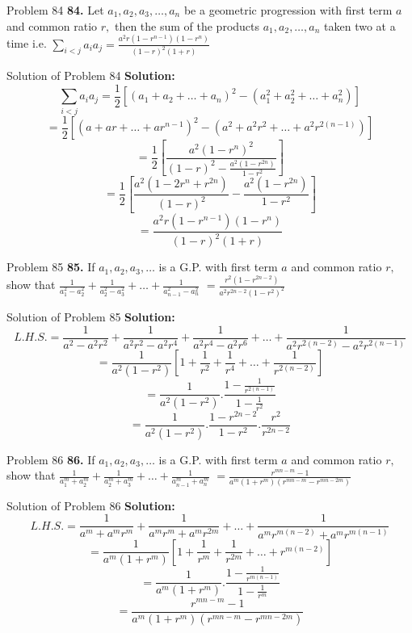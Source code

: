 \documentclass[aspectratio=1610,8pt]{beamer}
\begin{document}
\begin{frame}{Problem 84}
  \textbf{84.} Let $a_1, a_2, a_3, \ldots, a_n$ be a geometric progression with first term $a$ and common ratio $r,$ then the sum
  of the products $a_1, a_2, \ldots, a_n$ taken two at a time i.e. $\sum_{i < j}a_ia_j = \frac{a^2r(1 - r^{n - 1})(1 - r^n)}{(1 -
    r)^2(1 + r)}$
\end{frame}
\begin{frame}{Solution of Problem 84}
  \textbf{Solution:}$$\sum_{i < j}a_ia_j = \frac{1}{2}[(a_1 + a_2 + \ldots + a_n)^2 - (a_1^2 + a_2^2 + \ldots + a_n^2)]$$
  $$= \frac{1}{2}\left[(a + ar + \ldots + ar^{n - 1})^2 - (a^2 + a^2r^2 + \ldots + a^2r^{2(n - 1)})\right]$$
  $$= \frac{1}{2}\left[\frac{a^2(1 - r^n)^2}{(1 - r)^2 - \frac{a^2(1 - r^{2n})}{1 - r^2}}\right]$$
  $$= \frac{1}{2}\left[\frac{a^2(1 - 2r^n + r^{2n})}{(1 - r)^2} - \frac{a^2(1 - r^{2n})}{1 - r^2}\right]$$
  $$= \frac{a^2r(1 - r^{n - 1})(1 - r^n)}{(1 - r)^2(1 + r)}$$
\end{frame}
\begin{frame}{Problem 85}
  \textbf{85.} If $a_1, a_2, a_3, \ldots$ is a G.P. with first term $a$ and common ratio $r,$ show that $\frac{1}{a_1^2 - a_2^2} +
  \frac{1}{a_2^2 - a_3^2} + \ldots + \frac{1}{a_{n - 1}^2 - a_n^2}$ $ = \frac{r^2(1 - r^{2n - 2})}{a^2r^{2n - 2}(1 - r^2)^2}$
\end{frame}
\begin{frame}{Solution of Problem 85}
  \textbf{Solution:} $$L.H.S. = \frac{1}{a^2 - a^2r^2} + \frac{1}{a^2r^2 - a^2r^4} + \frac{1}{a^2r^4 - a^2r^6} + \ldots +
  \frac{1}{a^2r^{2(n - 2)} - a^2r^{2(n - 1)}}$$
  $$= \frac{1}{a^2(1 - r^2)}\left[1 + \frac{1}{r^2} + \frac{1}{r^4} + \ldots + \frac{1}{r^{2(n - 2)}}\right]$$
  $$= \frac{1}{a^2(1 - r^2)}.\frac{1 - \frac{1}{r^{2(n - 1)}}}{1 - \frac{1}{r^2}}$$
  $$= \frac{1}{a^2(1 - r^2)}.\frac{1 - r^{2n - 2}}{1 - r^2}.\frac{r^2}{r^{2n - 2}}$$
\end{frame}
\begin{frame}{Problem 86}
  \textbf{86.} If $a_1, a_2, a_3, \ldots$ is a G.P. with first term $a$ and common ratio $r,$ show that $\frac{1}{a_1^m + a_2^m} +
  \frac{1}{a_2^m + a_3^m} + \ldots + \frac{1}{a_{n - 1}^m + a_n^m}$ $= \frac{r^{mn - m} - 1}{a^m(1 + r^m)(r^{mn - m} - r^{mn - 2m})}$
\end{frame}
\begin{frame}{Solution of Problem 86}
  \textbf{Solution:} $$L.H.S. = \frac{1}{a^m + a^mr^m} + \frac{1}{a^mr^m + a^mr^{2m}} + \ldots + \frac{1}{a^mr^{m(n - 2)} +
    a^mr^{m(n - 1)}}$$
  $$= \frac{1}{a^m(1 + r^m)}\left[1 + \frac{1}{r^m} + \frac{1}{r^{2m}} + \ldots + r^{m(n - 2)}\right]$$
  $$= \frac{1}{a^m(1 + r^m)}.\frac{1 - \frac{1}{r^{m(n - 1)}}}{1 - \frac{1}{r^m}}$$
  $$= \frac{r^{mn - m} - 1}{a^m(1 + r^m)(r^{mn - m} - r^{mn - 2m})}$$
\end{frame}
\end{document}
